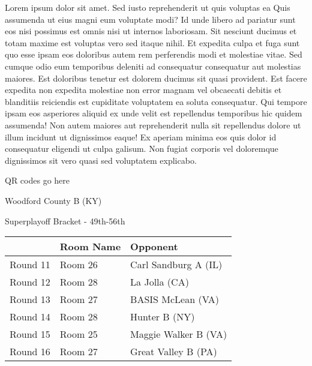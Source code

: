 \documentclass{article}%
\begin{document}
\vspace*{8pt}%
\linebreak%
\newline%
\newline%
    Lorem ipsum dolor sit amet. Sed iusto reprehenderit ut quis voluptas ea Quis assumenda ut eius magni eum voluptate modi? Id unde libero ad pariatur sunt eos nisi possimus est omnis nisi ut internos laboriosam. Sit nesciunt ducimus et totam maxime est voluptas vero sed itaque nihil. Et expedita culpa et fuga sunt quo esse ipsam eos doloribus autem rem perferendis modi et molestiae vitae.\newline%
\newline%
    Sed cumque odio eum temporibus deleniti ad consequatur consequatur aut molestias maiores. Est doloribus tenetur est dolorem ducimus sit quasi provident. Est facere expedita non expedita molestiae non error magnam vel obcaecati debitis et blanditiis reiciendis est cupiditate voluptatem ea soluta consequatur. Qui tempore ipsam eos asperiores aliquid ex unde velit est repellendus temporibus hic quidem assumenda!\newline%
\newline%
    Non autem maiores aut reprehenderit nulla sit repellendus dolore ut illum incidunt ut dignissimos eaque! Ex aperiam minima eos quis dolor id consequatur eligendi ut culpa galisum. Non fugiat corporis vel doloremque dignissimos sit vero quasi sed voluptatem explicabo.\newline%
\newline%
\vspace*{30pt}%
\begin{center}%
\begin{Huge}%
QR codes go here%
\end{Huge}%
\end{center}%
\newpage%
\begin{center}%
\begin{Huge}%
Woodford County B (KY)%
\end{Huge}%
\vspace*{8pt}%
\linebreak%
\begin{Large}%
Superplayoff Bracket {-} 49th{-}56th%
\end{Large}%
\end{center}%
%
\begin{tabularx}{\textwidth}{|c|Y|Y|}%
\hline%
&Room Name&Opponent\\%
\hline%
Round 11&Room 26&Carl Sandburg A (IL)\\%
Round 12&Room 28&La Jolla (CA)\\%
Round 13&Room 27&BASIS McLean (VA)\\%
Round 14&Room 28&Hunter B (NY)\\%
Round 15&Room 25&Maggie Walker B (VA)\\%
Round 16&Room 27&Great Valley B (PA)\\%
\hline%
\end{tabularx}%
\end{document}
